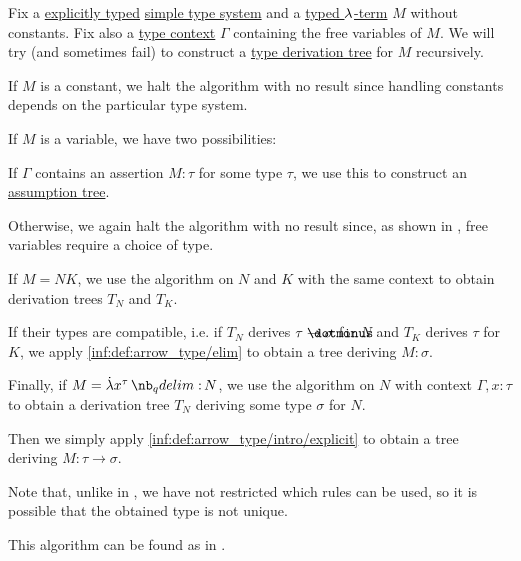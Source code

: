 \begin{algorithm}\label{alg:simply_typed_term_type_inference}
  Fix a \hyperref[def:simple_type_system_style]{explicitly typed} \hyperref[def:simple_type_system]{simple type system} and a \hyperref[def:typed_lambda_term]{typed \( {\mathrm \lambda} \)-term} \( M \) without constants. Fix also a \hyperref[def:type_context]{type context} \( \Gamma \) containing the free variables of \( M \). We will try (and sometimes fail) to construct a \hyperref[def:type_derivation_tree]{type derivation tree} for \( M \) recursively.

  \begin{thmenum}
     If \( M \) is a constant, we halt the algorithm with no result since handling constants depends on the particular type system.

     If \( M \) is a variable, we have two possibilities:
    \begin{thmenum}
       If \( \Gamma \) contains an assertion \( M: \tau \) for some type \( \tau \), we use this to construct an \hyperref[def:type_derivation_tree/assumption]{assumption tree}.

       Otherwise, we again halt the algorithm with no result since, as shown in , free variables require a choice of type.
    \end{thmenum}

     If \( M = NK \), we use the algorithm on \( N \) and \( K \) with the same context to obtain derivation trees \( T_N \) and \( T_K \).

    If their types are compatible, i.e. if \( T_N \) derives \( \tau \synimplies \sigma \) for \( N \) and \( T_K \) derives \( \tau \) for \( K \), we apply \ref{inf:def:arrow_type/elim} to obtain a tree deriving \( M: \sigma \).

     Finally, if \( M = \qabs {x^\tau} N \), we use the algorithm on \( N \) with context \( \Gamma, x: \tau \) to obtain a derivation tree \( T_N \) deriving some type \( \sigma \) for \( N \).

    Then we simply apply \ref{inf:def:arrow_type/intro/explicit} to obtain a tree deriving \( M: \tau \to \sigma \).
  \end{thmenum}
\end{algorithm}
\begin{comments}
  \item Note that, unlike in , we have not restricted which rules can be used, so it is possible that the obtained type is not unique.

  \item This algorithm can be found as  in \cite{notebook:code}.
\end{comments}
